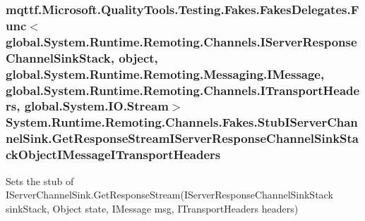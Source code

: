 \hypertarget{class_system_1_1_runtime_1_1_remoting_1_1_channels_1_1_fakes_1_1_stub_i_server_channel_sink_ae05e1ee9f8ad56bd54d3760a17930b27}{
\subsubsection[{Get\-Response\-Stream\-I\-Server\-Response\-Channel\-Sink\-Stack\-Object\-I\-Message\-I\-Transport\-Headers}]{\setlength{\rightskip}{0pt plus 5cm}mqttf.\-Microsoft.\-Quality\-Tools.\-Testing.\-Fakes.\-Fakes\-Delegates.\-Func$<$global.\-System.\-Runtime.\-Remoting.\-Channels.\-I\-Server\-Response\-Channel\-Sink\-Stack, object, global.\-System.\-Runtime.\-Remoting.\-Messaging.\-I\-Message, global.\-System.\-Runtime.\-Remoting.\-Channels.\-I\-Transport\-Headers, global.\-System.\-I\-O.\-Stream$>$ System.\-Runtime.\-Remoting.\-Channels.\-Fakes.\-Stub\-I\-Server\-Channel\-Sink.\-Get\-Response\-Stream\-I\-Server\-Response\-Channel\-Sink\-Stack\-Object\-I\-Message\-I\-Transport\-Headers}}\label{class_system_1_1_runtime_1_1_remoting_1_1_channels_1_1_fakes_1_1_stub_i_server_channel_sink_ae05e1ee9f8ad56bd54d3760a17930b27}


Sets the stub of I\-Server\-Channel\-Sink.\-Get\-Response\-Stream(\-I\-Server\-Response\-Channel\-Sink\-Stack sink\-Stack, Object state, I\-Message msg, I\-Transport\-Headers headers)


